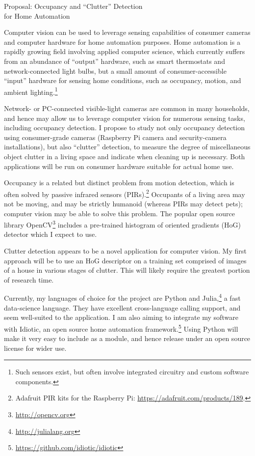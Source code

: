 \documentclass{article}
\begin{document}
\begin{center}
    \LARGE Proposal: Occupancy and ``Clutter'' Detection \\
    for Home Automation
\end{center}

Computer vision can be used to leverage sensing capabilities of consumer cameras
and computer hardware for home automation purposes. Home automation is a rapidly
growing field involving applied computer science, which currently suffers from
an abundance of ``output'' hardware, such as smart thermostats and
network-connected light bulbs, but a small amount of consumer-accessible
``input'' hardware for sensing home conditions, such as occupancy, motion, and
ambient lighting.\footnote{Such sensors exist, but often involve integrated
circuitry and custom software components.}

Network- or PC-connected visible-light cameras are common in many households,
and hence may allow us to leverage computer vision for numerous sensing tasks,
including occupancy detection. I propose to study not only occupancy detection
using consumer-grade cameras (Raspberry Pi camera and security-camera
installations), but also ``clutter'' detection, to measure the degree of
miscellaneous object clutter in a living space and indicate when cleaning up is
necessary. Both applications will be run on consumer hardware suitable for
actual home use.

Occupancy is a related but distinct problem from motion detection, which is
often solved by passive infrared sensors (PIRs).\footnote{Adafruit PIR kits
    for the Raspberry Pi: \url{https://adafruit.com/products/189}.}
Occupants of a living area may not be moving, and may be strictly humanoid
(whereas PIRs may detect pets); computer vision may be able to solve this
problem. The popular open source library
OpenCV\footnote{\url{http://opencv.org}}
includes a pre-trained histogram of oriented gradients (HoG) detector which I
expect to use.

Clutter detection appears to be a novel application for computer vision. My
first approach will be to use an HoG descriptor on a training set comprised of
images of a house in various stages of clutter. This will likely require the
greatest portion of research time.

Currently, my languages of choice for the project are Python and
Julia,\footnote{\url{http://julialang.org}} a fast data-science language. They
have excellent cross-language calling support, and seem well-suited to the
application. I am also aiming to integrate my software with Idiotic, an open
source home automation
framework.\footnote{\url{https://github.com/idiotic/idiotic}} Using Python will
make it very easy to include as a module, and hence release under an open source
license for wider use.
\end{document}
